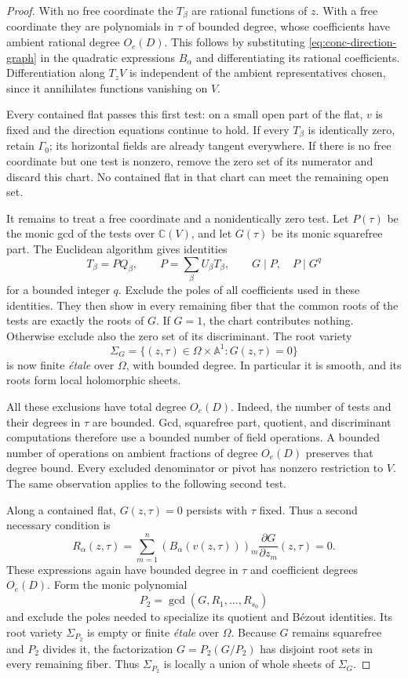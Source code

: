 \begin{proof}
With no free coordinate the $T_\beta$ are rational functions of $z$. With a free coordinate they are polynomials in $\tau$ of bounded degree, whose coefficients have ambient rational degree $O_e(D)$. This follows by substituting \eqref{eq:conc-direction-graph} in the quadratic expressions $B_\alpha$ and differentiating its rational coefficients.  Differentiation along $T_zV$ is independent of the ambient representatives chosen, since it annihilates functions vanishing on $V$.

Every contained flat passes this first test: on a small open part of the flat, $v$ is fixed and the direction equations continue to hold. If every $T_\beta$ is identically zero, retain $\Gamma_0$; its horizontal fields are already tangent everywhere.  If there is no free coordinate but one test is nonzero, remove the zero set of its numerator and discard this chart.  No contained flat in that chart can meet the remaining open set.

It remains to treat a free coordinate and a nonidentically zero test. Let $P(\tau)$ be the monic gcd of the tests over $\mathbb{C}(V)$, and let $G(\tau)$ be its monic squarefree part.  The Euclidean algorithm gives identities
\[
 T_\beta=P Q_\beta,\qquad
 P=\sum_\beta U_\beta T_\beta,
 \qquad G\mid P,\quad P\mid G^q
\]
for a bounded integer $q$.  Exclude the poles of all coefficients used in these identities.  They then show in every remaining fiber that the common roots of the tests are exactly the roots of $G$. If $G=1$, the chart contributes nothing.  Otherwise exclude also the zero set of its discriminant.  The root variety
\[
 \Sigma_G=\{(z,\tau)\in\Omega\times\mathbb{A}^1:G(z,\tau)=0\}
\]
is now finite \emph{\'etale} over $\Omega$, with bounded degree.  In particular it is smooth, and its roots form local holomorphic sheets.

All these exclusions have total degree $O_e(D)$.  Indeed, the number of tests and their degrees in $\tau$ are bounded.  Gcd, squarefree part, quotient, and discriminant computations therefore use a bounded number of field operations.  A bounded number of operations on ambient fractions of degree $O_e(D)$ preserves that degree bound. Every excluded denominator or pivot has nonzero restriction to $V$. The same observation applies to the following second test.

Along a contained flat, $G(z,\tau)=0$ persists with $\tau$ fixed. Thus a second necessary condition is
\[
 R_\alpha(z,\tau)
 =\sum_{m=1}^{n}(B_\alpha(v(z,\tau)))_m
                  \frac{\partial G}{\partial z_m}(z,\tau)=0.
\]
These expressions again have bounded degree in $\tau$ and coefficient degrees $O_e(D)$.  Form the monic polynomial
\[
 P_2=\gcd(G,R_1,\ldots,R_{s_0})
\]
and exclude the poles needed to specialize its quotient and B\'ezout identities.  Its root variety $\Sigma_{P_2}$ is empty or finite \emph{\'etale} over $\Omega$.  Because $G$ remains squarefree and $P_2$ divides it, the factorization $G=P_2(G/P_2)$ has disjoint root sets in every remaining fiber.  Thus $\Sigma_{P_2}$ is locally a union of whole sheets of $\Sigma_G$.


\end{proof}
